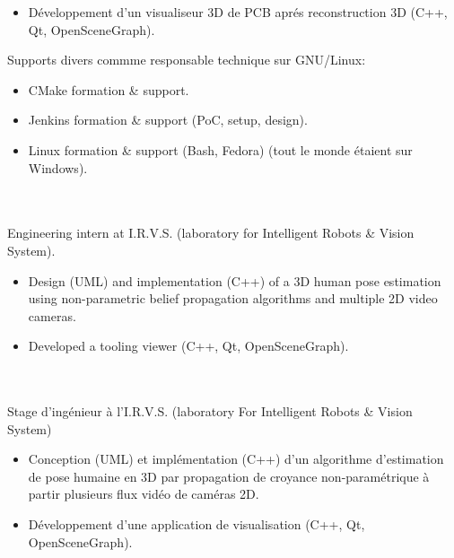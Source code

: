 \documentclass{resume}
\begin{document}
{\begin{itemize}
  	\item D\'{e}veloppement d'un visualiseur 3D de PCB apr\'{e}s reconstruction 3D (C++, Qt, OpenSceneGraph).
  \end{itemize}
  Supports divers commme responsable technique sur GNU/Linux:\\
  \begin{itemize}
  	\item CMake formation \& support.
  	\item Jenkins formation \& support (PoC, setup, design).
  	\item Linux formation \& support (Bash, Fedora) (tout le monde \'{e}taient sur Windows).
  \end{itemize}
}

\bigskip

 {
   \\
   \\
  Engineering intern at I.R.V.S. (laboratory for Intelligent Robots \& Vision System). \\
  \begin{itemize}
  	\item Design (UML) and implementation (C++) of a
  		3D human pose estimation using non-parametric belief propagation
  		algorithms and multiple 2D video cameras.
  	\item Developed a tooling viewer (C++, Qt, OpenSceneGraph).
  \end{itemize}
} {
   \\
   \\
  Stage d'ing\'{e}nieur \`{a} l'I.R.V.S. (laboratory For Intelligent Robots \& Vision System) \\
  \begin{itemize}
  	\item Conception (UML) et impl\'{e}mentation (C++) d'un algorithme
  		d'estimation de pose humaine en 3D par propagation de croyance
  		non-param\'{e}trique \`{a} partir plusieurs flux vid\'{e}o de cam\'{e}ras 2D.
  	\item D\'{e}veloppement d'une application de visualisation (C++, Qt, OpenSceneGraph).
  \end{itemize}
}

\bigskip
\end{document}

